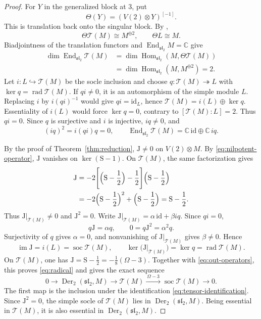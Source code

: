 \documentclass[11pt,reqno]{amsart}
\numberwithin{equation}{section}
\newcommand{\C}{\mathbb C}
\newcommand{\s}{\mathfrak{sl}_2}
\newcommand{\T}{\mathcal T}
\DeclareMathOperator{\Der}{Der}
\DeclareMathOperator{\Hom}{Hom}
\DeclareMathOperator{\End}{End}
\DeclareMathOperator{\soc}{soc}
\DeclareMathOperator{\rad}{rad}
\DeclareMathOperator{\im}{im}
\theoremstyle{definition}
\theoremstyle{remark}
\begin{document}
\begin{proof}
For \(Y\) in the generalized block at \(3\), put
\[
\Theta(Y)=(V(2)\otimes Y)^{[-1]}.
\]
This is translation back onto the singular block. By
\cite[Lemma~12(ii) and Theorem~26(i)]{CCM21},
\[
\Theta\T(M)\cong M^{\oplus2},\qquad \Theta L\cong M.
\]
Biadjointness of the translation functors and \(\End_{\s}M=\C\) give
\[
\begin{aligned}
\dim\End_{\s}\T(M)
&=\dim\Hom_{\s}(M,\Theta\T(M))\\
&=\dim\Hom_{\s}(M,M^{\oplus2})=2.
\end{aligned}
\]
Let \(i:L\hookrightarrow\T(M)\) be the socle inclusion and choose
\(q:\T(M)\twoheadrightarrow L\) with \(\ker q=\rad\T(M)\).
If \(qi\ne0\), it is an automorphism of the simple module
\(L\). Replacing \(i\) by \(i(qi)^{-1}\) would give
\(qi=\mathrm{id}_L\), hence
\(\T(M)=i(L)\oplus\ker q\). Essentiality of \(i(L)\)
would force \(\ker q=0\), contrary to \([\T(M):L]=2\).
Thus \(qi=0\). Since \(q\) is surjective and \(i\) is
injective, \(iq\ne0\), and
\[
(iq)^2=i(qi)q=0,\qquad
\End_{\s}\T(M)=\C\,\mathrm{id}\oplus\C\,iq.
\]

By the proof of
Theorem~\ref{thm:reduction}, \(\mathrm{J}\ne0\) on \(V(2)\otimes M\).
By \eqref{eq:nilpotent-operator}, \(\mathrm{J}\) vanishes on
\(\ker(\mathrm{S}-1)\). On \(\T(M)\), the same factorization gives
\[
\begin{aligned}
\mathrm{J}
&=-2\Biggl[\Bigl(\mathrm{S}-\frac{1}{2}\Bigr)-\frac{1}{2}\Biggr]
\Bigl(\mathrm{S}-\frac{1}{2}\Bigr)\\
&=-2\Bigl(\mathrm{S}-\frac{1}{2}\Bigr)^2
  +\Bigl(\mathrm{S}-\frac{1}{2}\Bigr)
 =\mathrm{S}-\frac{1}{2}.
\end{aligned}
\]
Thus \(\mathrm{J}|_{\T(M)}\ne0\) and \(\mathrm{J}^2=0\).
Write \(\mathrm{J}|_{\T(M)}=\alpha\,\mathrm{id}+\beta iq\).
Since \(qi=0\),
\[
q\mathrm{J}=\alpha q,\qquad
0=q\mathrm{J}^2=\alpha^2q.
\]
Surjectivity of \(q\) gives \(\alpha=0\), and nonvanishing of
\(\mathrm{J}|_{\T(M)}\) gives \(\beta\ne0\). Hence
\[
\im\mathrm{J}=i(L)=\soc\T(M),\qquad
\ker\bigl(\mathrm{J}|_{\T(M)}\bigr)=\ker q=\rad\T(M).
\]
On \(\T(M)\), one has
\(\mathrm{J}=\mathrm{S}-\frac{1}{2}=-\frac{1}{8}(\Omega-3)\).
Together with \eqref{eq:out-operators}, this proves
\eqref{eq:radical} and gives the exact sequence
\begin{equation}\label{eq:translated-exact}
0\longrightarrow\Der_2(\s,M)\longrightarrow\T(M)
\xrightarrow{\ \Omega-3\ }\soc\T(M)\longrightarrow0.
\end{equation}
The first map is the inclusion under the identification
\eqref{eq:tensor-identification}.
Since \(\mathrm{J}^2=0\), the simple socle of \(\T(M)\) lies in
\(\Der_2(\s,M)\). Being essential in \(\T(M)\), it is also
essential in \(\Der_2(\s,M)\).


\end{proof}
\end{document}
